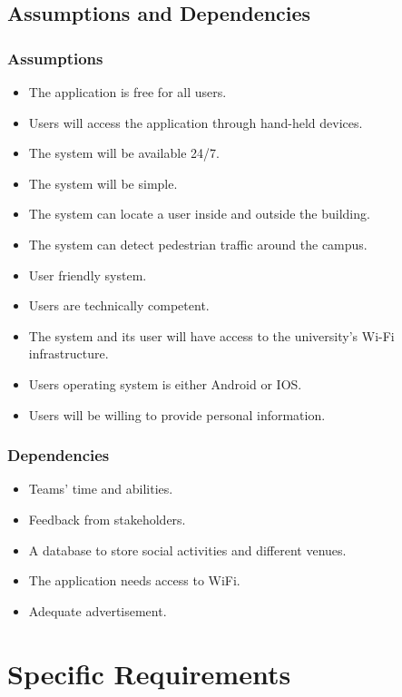 \documentclass[english]{article}
\begin{document}
		\subsection{Assumptions and Dependencies}
		\subsubsection{Assumptions}
	\begin{itemize}
		\item The application is free for all users.
		\item Users will access the application through hand-held devices.
		\item The system will be available 24/7.
		\item The system will be simple.
		\item The system can locate a user inside and outside the building.
		\item The system can detect pedestrian traffic around the campus.
		\item User friendly system.
		\item Users are technically competent.
		\item The system and its user will have access to the university's Wi-Fi infrastructure.
		\item Users operating system is either Android or IOS.
		\item Users will be willing to provide personal information.

\end{itemize}


\begin{large}
	\subsubsection{Dependencies}
	\end{large}
	\begin{itemize}
		\item Teams' time and abilities. 
		\item Feedback from stakeholders. 
		\item A database to store social activities and different venues.
		\item The application needs access to WiFi.
		\item Adequate advertisement. 

	\end{itemize}
	\newpage

	\section{Specific Requirements}
\end{document}
